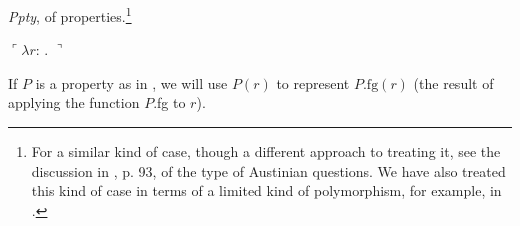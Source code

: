 \textit{Ppty}, of properties.\footnote{%
  For a similar kind of case, though a different approach to treating
  it, see the discussion in \cite{GinzburgCooperFernando2014}, p. 93,
  of the type of Austinian questions.  We have also treated this kind
  of case in terms of a limited kind of polymorphism, for example, in \cite{GinzburgCooper2014}.}
\begin{ex} 
\begin{subex} 
 
\item {}

          
        \item $\ulcorner\lambda
                r$:
                . $\urcorner$
 
\item {} 
 
\end{subex} 
\label{ex:dog-Ppty}   
\end{ex}
If $P$ is a property as in , we will use $P(r)$ to
represent $P.\text{fg}(r)$ (the result of applying the function $P$.fg
to $r$).
